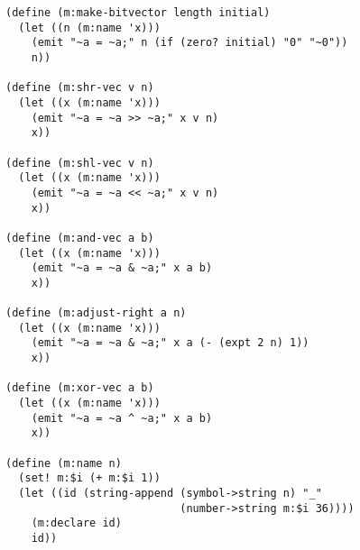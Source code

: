 
\topmargin      -1.0cm
\oddsidemargin  -1.0cm
\evensidemargin -1.0cm
\textwidth       8.0in
\textheight      11.0in


\Large
\begin{verbatim}
(define (m:make-bitvector length initial)
  (let ((n (m:name 'x)))
    (emit "~a = ~a;" n (if (zero? initial) "0" "~0"))
    n))

(define (m:shr-vec v n)
  (let ((x (m:name 'x)))
    (emit "~a = ~a >> ~a;" x v n)
    x))

(define (m:shl-vec v n)
  (let ((x (m:name 'x)))
    (emit "~a = ~a << ~a;" x v n)
    x))

(define (m:and-vec a b)
  (let ((x (m:name 'x)))
    (emit "~a = ~a & ~a;" x a b)
    x))

(define (m:adjust-right a n)
  (let ((x (m:name 'x)))
    (emit "~a = ~a & ~a;" x a (- (expt 2 n) 1))
    x))

(define (m:xor-vec a b)
  (let ((x (m:name 'x)))
    (emit "~a = ~a ^ ~a;" x a b)
    x))

(define (m:name n)
  (set! m:$i (+ m:$i 1))
  (let ((id (string-append (symbol->string n) "_"
                           (number->string m:$i 36))))
    (m:declare id)
    id))
\end{verbatim}



